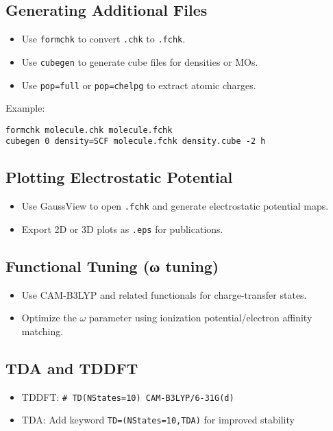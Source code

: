 \subsection*{Generating Additional Files}

\begin{itemize}
  \item Use \texttt{formchk} to convert \texttt{.chk} to \texttt{.fchk}.
  \item Use \texttt{cubegen} to generate cube files for densities or MOs.
  \item Use \texttt{pop=full} or \texttt{pop=chelpg} to extract atomic charges.
\end{itemize}

Example:

\begin{verbatim}
formchk molecule.chk molecule.fchk
cubegen 0 density=SCF molecule.fchk density.cube -2 h
\end{verbatim}

\subsection*{Plotting Electrostatic Potential}

\begin{itemize}
  \item Use GaussView to open \texttt{.fchk} and generate electrostatic potential maps.
  \item Export 2D or 3D plots as \texttt{.eps} for publications.
\end{itemize}

\subsection*{Functional Tuning (ω tuning)}

\begin{itemize}
  \item Use CAM-B3LYP and related functionals for charge-transfer states.
  \item Optimize the $\omega$ parameter using ionization potential/electron affinity matching.
\end{itemize}

\subsection*{TDA and TDDFT}

\begin{itemize}
  \item TDDFT: \texttt{\# TD(NStates=10) CAM-B3LYP/6-31G(d)}
  \item TDA: Add keyword \texttt{TD=(NStates=10,TDA)} for improved stability
\end{itemize}

